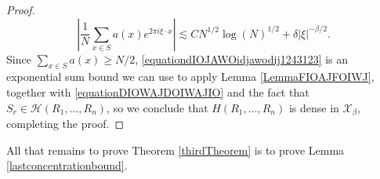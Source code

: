 \documentclass[dvipsnames,letterpaper,12pt]{article}
\numberwithin{equation}{section}
\numberwithin{theorem}{section}
\begin{document}
\begin{proof}
    \begin{equation} \label{equationdIOJAWOidjawodij1243123}
        \left| \frac{1}{N} \sum_{x \in S} a(x) e^{2 \pi i \xi \cdot x} \right| \lesssim C N^{1/2} \log(N)^{1/2} + \delta |\xi|^{-\beta/2}.
    \end{equation}
    Since $\sum_{x \in S} a(x) \geq N/2$, \eqref{equationdIOJAWOidjawodij1243123} is an exponential sum bound we can use to apply Lemma \ref{LemmaFIOAJFOIWJ}, together with \eqref{equationDIOWAJDOIWAJIO} and the fact that $S_r \in \mathcal{H}(R_1,\dots,R_n)$, so we conclude that $H(R_1,\dots,R_n)$ is dense in $\mathcal{X}_\beta$, completing the proof.
\end{proof}

All that remains to prove Theorem \ref{thirdTheorem} is to prove Lemma \ref{lastconcentrationbound}.
\end{document}
